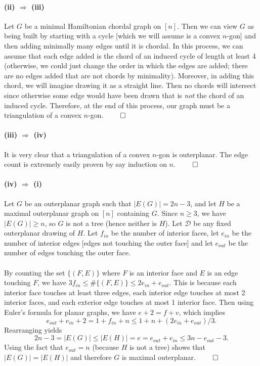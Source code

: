 \documentclass[10pt,a4paper]{article}
\newcommand{\Dee}{\mathcal{D}}
\newcommand{\1}{\mathbf{1}}
\begin{document}
\paragraph*{(ii) $\Rightarrow$ (iii)}Let $G$ be a minimal Hamiltonian chordal graph on $[n]$.  Then we can view $G$ as being built by starting with a cycle [which we will assume is a convex $n$-gon] and then adding minimally many edges until it is chordal.  In this process, we can assume that each edge added is the chord of an induced cycle of length at least 4 (otherwise, we could just change the order in which the edges are added; there are no edges added that are not chords by minimality).  Moreover, in adding this chord, we will imagine drawing it as a straight line.  Then no chords will intersect since otherwise some edge would have been drawn that is \textit{not} the chord of an induced cycle.  Therefore, at the end of this process, our graph must be a triangulation of a convex $n$-gon. $\qed$

\paragraph*{(iii) $\Rightarrow$ (iv)}It is very clear that a triangulation of a convex $n$-gon is outerplanar.  The edge count is extremely easily proven by say induction on $n$. $\qed$

\paragraph*{(iv) $\Rightarrow$ (i)}Let $G$ be an outerplanar graph such that $|E(G)| = 2n-3$, and let $H$ be a maximal outerplanar graph on $[n]$ containing $G$. Since $n \geq 3$, we have $|E(G)| \geq n$, so $G$ is not a tree (hence neither is $H$).  Let $\Dee$ be any fixed outerplanar drawing of $H$.  Let $f_{in}$ be the number of interior faces, let $e_{in}$ be the number of interior edges [edges not touching the outer face] and let $e_{out}$ be the number of edges touching the outer face.
\paragraph*{}By counting the set $\{(F, E)\}$ where $F$ is an interior face and $E$ is an edge touching $F$, we have $3 f_{in} \leq \# \{(F,E)\} \leq 2 e_{in} + e_{out}$.  This is because each interior face touches at least three edges, each interior edge touches at most 2 interior faces, and each exterior edge touches at most 1 interior face.  Then using Euler's formula for planar graphs, we have $e +2 = f+v$, which implies
\[
e_{out} + e_{in} + 2 = 1+ f_{in} + n \leq 1+ n + (2 e_{in} + e_{out}) / 3.
\]
Rearranging yields
\[
2n - 3= |E(G)| \leq |E(H)| = e = e_{out} + e_{in} \leq 3n - e_{out} - 3.
\]
Using the fact that $e_{out} = n$ (because $H$ is not a tree) shows that $|E(G)| = |E(H)|$ and therefore $G$ is maximal outerplanar. $\qed$
\end{document}
